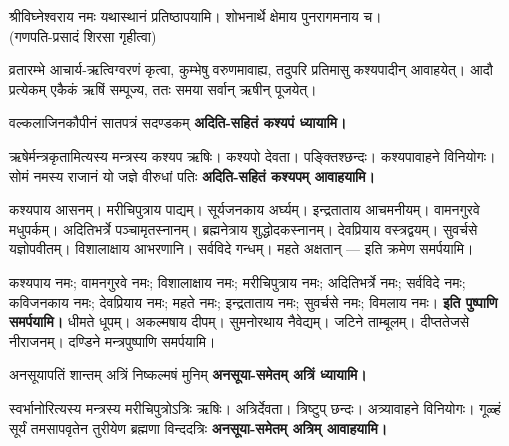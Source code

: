 श्रीविघ्नेश्वराय नमः यथास्थानं प्रतिष्ठापयामि। शोभनार्थे क्षेमाय पुनरागमनाय च।\\
(गणपति-प्रसादं शिरसा गृहीत्वा)





\begingroup
\renewcommand{\devaName}{ऋषि}

\endgroup








व्रतारम्भे आचार्य-ऋत्विग्वरणं कृत्वा, कुम्भेषु वरुणमावाह्य, तदुपरि प्रतिमासु
कश्यपादीन् आवाहयेत्। आदौ प्रत्येकम् एकैकं ऋषिं सम्पूज्य, ततः समया सर्वान् ऋषीन् पूजयेत्।

{वल्कलाजिनकौपीनं सातपत्रं सदण्डकम्}
\textbf{अदिति-सहितं कश्यपं ध्यायामि।}

ऋषेर्मन्त्रकृतामित्यस्य मन्त्रस्य कश्यप ऋषिः। कश्यपो देवता। पङ्क्तिश्छन्दः।
कश्यपावाहने विनियोगः।
{सोमं नमस्य राजानं यो जज्ञे वीरुधां पतिः}
\textbf{अदिति-सहितं कश्यपम् आवाहयामि।}

कश्यपाय आसनम्। मरीचिपुत्राय पाद्यम्। सूर्यजनकाय अर्घ्यम्। इन्द्रताताय
आचमनीयम्। वामनगुरवे मधुपर्कम्। अदितिभर्त्रे पञ्चामृतस्नानम्। ब्रह्मनेत्राय
शुद्धोदकस्नानम्। देवप्रियाय वस्त्रद्वयम्। सुवर्चसे यज्ञोपवीतम्। विशालाक्षाय
आभरणानि। सर्वविदे गन्धम्। महते अक्षतान् — इति क्रमेण समर्पयामि।

कश्यपाय नमः; वामनगुरवे नमः; विशालाक्षाय नमः; मरीचिपुत्राय नमः; अदितिभर्त्रे नमः; सर्वविदे नमः; कविजनकाय नमः; देवप्रियाय नमः; महते नमः; इन्द्रताताय नमः; सुवर्चसे नमः; विमलाय नमः।
\textbf{इति पुष्पाणि समर्पयामि।} धीमते धूपम्। अकल्मषाय दीपम्। सुमनोरथाय
नैवेद्यम्। जटिने ताम्बूलम्। दीप्ततेजसे नीराजनम्। दण्डिने मन्त्रपुष्पाणि समर्पयामि।

{अनसूयापतिं शान्तम् अत्रिं निष्कल्मषं मुनिम्}
\textbf{अनसूया-समेतम् अत्रिं ध्यायामि।}

स्वर्भानोरित्यस्य मन्त्रस्य मरीचिपुत्रोऽत्रिः ऋषिः। अत्रिर्देवता। त्रिष्टुप् छन्दः।
अत्र्यावाहने विनियोगः।
{गूळ्हं सूर्यं तमसापवृतेन तुरीयेण ब्रह्मणा विन्ददत्रिः}
\textbf{अनसूया-समेतम् अत्रिम् आवाहयामि।}

